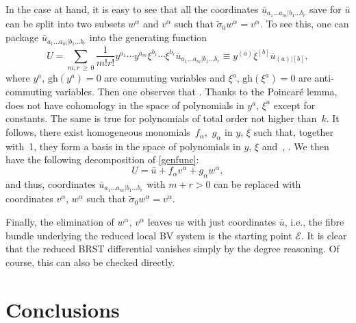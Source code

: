 \documentclass[pdftex]{sigma}
\numberwithin{equation}{section}
\theoremstyle{definition}
\renewcommand{\tilde}{\widetilde}
\newcommand{\gh}[1]{\mathrm{gh}(#1)}
\renewcommand{\geq}{\,{\geqslant}\,}
\def\cE{\mathcal{E}}
\begin{document}
In the case at hand, it is easy to see that all the coordinates $\bar{u}_{a_1\dots a_m|b_1\dots b_r}$ save for $\bar{u}$ can be split into two subsets $w^\alpha$ and $v^\alpha$ such that $\tilde\sigma_0 w^\alpha=v^\alpha$. To see this, one can package $\bar{u}_{a_1\dots a_m|b_1\dots b_r}$ into the generating function
\begin{equation}\label{genfunc}
 U=\sum_{m,r\geq0}\frac{1}{m!r!}y^{a_1}\cdots y^{a_m}\xi^{b_1}\cdots\xi^{b_r}\bar{u}_{a_1\dots a_m|b_1\dots b_r}\equiv y^{(a)}\xi^{[b]}\bar{u}_{(a)|[b]},
\end{equation}
where $y^a$, $\gh{y^a}=0$ are commuting variables and $\xi^a$, $\gh{\xi^a}=0$ are anti-commuting variables. Then one observes that \smash{$\tilde\sigma_0 U=\xi^a\frac{\partial}{\partial y^a} U$}.
Thanks to the Poincar\'{e} lemma,  does not have cohomology in the space of polynomials in $y^a$, $\xi^a$ except for constants. The same is true for polynomials of total order not higher than~$k$. It follows, there exist homogeneous monomials~$f_\alpha$,~$g_\alpha$ in $y$, $\xi$ such that, together with~1, they form a basis in the space of polynomials in $y$, $\xi$ and~, . We then have the following decomposition of \eqref{genfunc}:
\begin{equation*}
 U=\bar{u}+f_{\alpha}v^{\alpha}+g_{\alpha}w^{\alpha},
\end{equation*}
 and thus, coordinates $\bar{u}_{a_1\dots a_m|b_1\dots b_r}$ with $m+r>0$ can be replaced with coordinates $v^{\alpha}$, $w^{\alpha}$ such that $\tilde\sigma_0 w^{\alpha}=v^{\alpha}$.

Finally, the elimination of $w^\alpha$, $v^\alpha$ leaves us with just coordinates $\bar{u}$, i.e., the fibre bundle
underlying the reduced local BV system is the starting point $\cE$. It is clear that the reduced BRST differential vanishes simply by the degree reasoning. Of course, this can also be checked directly.

\section{Conclusions}
\end{document}
